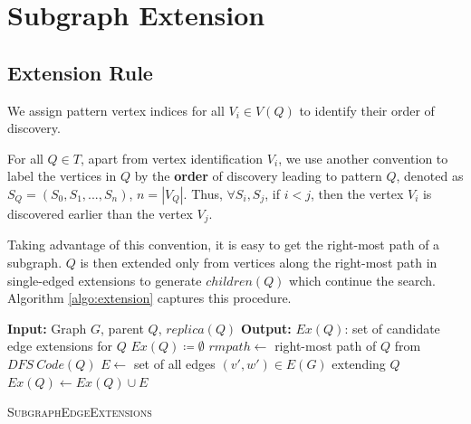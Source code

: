 \section{Subgraph Extension}
\label{subsec:subgraph-ext}
\subsection{Extension Rule}
We assign pattern vertex indices for all $V_i\in V(Q)$ to identify their order of discovery.
\begin{defn} For all $Q\in T$, apart from vertex
	identification $V_i$, we use another convention to label the vertices in $Q$
	by the \textbf{order} of discovery leading to pattern $Q$, denoted as
	$S_Q=(S_0,S_1,...,S_n)$, $n=|V_Q|$. Thus, $\forall S_i, S_j$, if $i<j$, then
	the vertex $V_i$ is discovered earlier than the vertex $V_j$.
\end{defn}

Taking advantage of this convention, it is easy to get the right-most path of a
subgraph. $Q$ is then extended only from vertices along the right-most path in
single-edged extensions to generate $children(Q)$ which continue the search. Algorithm
\ref{algo:extension} captures this procedure.

\begin{algorithm}
	\dontprintsemicolon
	\nonl \textbf{Input:} Graph $G$, parent $Q$, $replica(Q)$ \;
	\nonl \textbf{Output:} $Ex(Q)$: set of candidate edge extensions for $Q$\;
	$Ex(Q)\coloneq \emptyset$ \;
	$rmpath \leftarrow$ right-most path of $Q$ from $DFS\ Code(Q)$\;
	{
		{
			$E\leftarrow$ set of all edges $(v',w')\in E(G)$ extending $Q$\;
			$Ex(Q)\leftarrow Ex(Q)\cup E$
		}
	}
	\caption{\textsc{SubgraphEdgeExtensions}}\label{algo:extension}
\end{algorithm}

